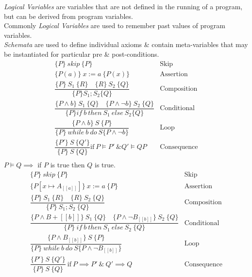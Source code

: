 \documentclass[11pt,a4paper]{article}
\begin{document}
\textit{Logical Variables} are variables that are not defined in the running of a program, but can be derived from program variables.\\
\nb Commonly \textit{Logical Variables} are used to remember past values of program variables.\\

\textit{Schemata} are used to define individual axioms \& contain meta-variables that may be instantiated for particular pre \& post-conditions.\\

\[\begin{array}{ll}
\{P\}\ skip\ \{P\}&\mathrm{Skip}\\
\{P(a)\}\ x:=a\ \{P(x)\}&\mathrm{Assertion}\\
\dfrac{\{P\}\ S_1\ \{R\}\quad\{R\}\ S_2\ \{Q\}}{\{P\}S_1;S_2\{Q\}}&\mathrm{Composition}\\
\dfrac{\{P\wedge b\}\ S_1\ \{Q\}\quad\{P\wedge\neg b\}\ S_2\ \{Q\}}{\{P\}if\ b\ then\ S_1\ else\  S_2\{Q\}}&\mathrm{Conditional}\\
\dfrac{\{P\wedge b\}\ S\ \{P\}}{\{P\}\ while\ b\ do\ S\{P\wedge\neg b\}}&\mathrm{Loop}\\
\dfrac{\{P'\}\ S\ \{Q'\}}{\{P\}\ S\ \{Q\}}\mathrm{if}\ P\vDash P'\ \& Q'\vDash Q P&\mathrm{Consequence}\\
\end{array}\]
\nb $P\vDash Q\implies$ if $P$ is true then $Q$ is true.\\

\[\begin{array}{ll}
\{P\}\ skip\ \{P\}&\mathrm{Skip}\\
\{P[x\mapsto A_{[[a]]}]\}\ x:=a\ \{P\}&\mathrm{Assertion}\\
\dfrac{\{P\}\ S_1\ \{R\}\quad\{R\}\ S_2\ \{Q\}}{\{P\}\ S_1; S_2\ \{Q\}}&\mathrm{Composition}\\
\dfrac{\{P\wedge B+{[[b]]}\}\ S_1\ \{Q\}\quad\{P\wedge\neg B_{[[b]]}\}\ S_2\ \{Q\}}{\{P\}\ if\ b\ then\ S_1\ else\ S_2\ \{Q\}}&\mathrm{Conditional}\\
\dfrac{\{P\wedge B_{[[b]]}\}\ S\ \{P\}}{\{P\}\ while\ b\ do\ S \{P\wedge\neg B_{[[b]]}\}}&\mathrm{Loop}\\
\dfrac{\{P'\}\ S\ \{Q'\}}{\{P\}\ S\ \{Q\}}\ \mathrm{if}\ P\implies P'\ \&\ Q'\implies Q&\mathrm{Consequence}\\
\end{array}\]
\end{document}
